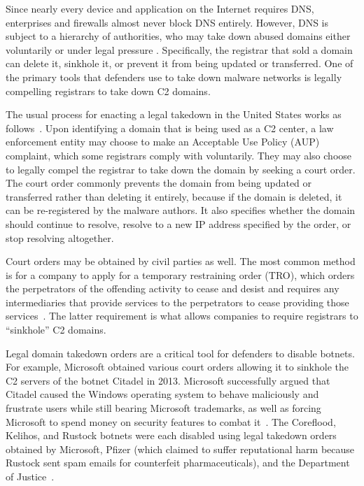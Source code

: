 Since nearly every device and application on the Internet 
requires DNS, enterprises and firewalls almost never block DNS entirely. 
However, DNS is subject to a hierarchy of authorities, who may take down abused 
domains either voluntarily or under legal pressure . Specifically, the 
registrar that sold a domain can delete it, sinkhole it, or 
prevent it from being updated or transferred. One of the primary tools that 
defenders use to take down malware networks is legally compelling registrars to 
take down C2 domains.

The usual process for enacting a legal takedown in the United States works as 
follows~\cite{knight_domain_2015}. Upon identifying a domain that is being used 
as a C2 center, a law enforcement entity may choose to make 
an Acceptable Use Policy (AUP) complaint, which some registrars comply with 
voluntarily. They may also choose to legally compel the registrar to take down 
the domain by 
seeking a court order. The court order commonly prevents the domain from being 
updated or transferred rather than deleting it entirely, because if 
the domain is deleted, it can be re-registered by the malware authors. It also 
specifies whether the domain should continue to resolve, resolve to a new IP 
address specified by the order, or stop resolving altogether. 

Court orders may be obtained by civil parties as well. The most common method 
is for a company to 
apply for a temporary restraining order (TRO), which orders the perpetrators 
of the offending 
activity to cease and desist and requires any intermediaries that provide 
services to the 
perpetrators to cease providing those services~\cite{kesari_deterring_2017}. 
The latter requirement 
is what allows companies to require registrars to ``sinkhole'' C2 
domains. 

Legal domain takedown orders are a critical tool for defenders to disable 
botnets. For example, 
Microsoft obtained various court orders allowing it to sinkhole the C2 servers 
of the botnet 
Citadel in 2013. Microsoft successfully argued that Citadel caused the Windows 
operating system to 
behave maliciously and frustrate users while still bearing Microsoft 
trademarks, as well as forcing 
Microsoft to spend money on security features to combat 
it~\cite{lerner_microsoft_2014}. The 
Coreflood, Kelihos, and Rustock botnets were each disabled using legal 
takedown orders obtained by 
Microsoft, Pfizer (which claimed to suffer reputational harm because Rustock 
sent spam emails for 
counterfeit pharmaceuticals), and the Department of 
Justice~\cite{kesari_deterring_2017}. 

